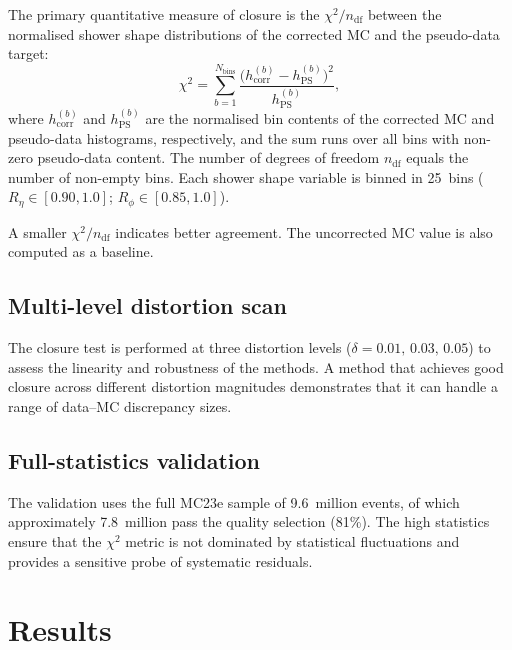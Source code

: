 \documentclass[12pt,a4paper]{article}
\begin{document}
The primary quantitative measure of closure is the $\chi^2/n_\text{df}$
between the normalised shower shape distributions of the corrected MC and the
pseudo-data target:
\begin{equation}
  \chi^2 = \sum_{b=1}^{N_\text{bins}}
    \frac{\bigl(h_\text{corr}^{(b)} - h_\text{PS}^{(b)}\bigr)^2}
         {h_\text{PS}^{(b)}},
  \label{eq:chi2}
\end{equation}
where $h_\text{corr}^{(b)}$ and $h_\text{PS}^{(b)}$ are the normalised bin
contents of the corrected MC and pseudo-data histograms, respectively, and the
sum runs over all bins with non-zero pseudo-data content. The number of
degrees of freedom $n_\text{df}$ equals the number of non-empty bins. Each
shower shape variable is binned in 25~bins
($R_\eta\in[0.90,1.0]$;
$R_\phi\in[0.85,1.0]$).

A smaller $\chi^2/n_\text{df}$ indicates better agreement. The uncorrected MC
value is also computed as a baseline.

\subsection{Multi-level distortion scan}
\label{sec:validation:scan}

The closure test is performed at three distortion levels
($\delta=0.01,\,0.03,\,0.05$) to assess the linearity and robustness of the
methods. A method that achieves good closure across different distortion
magnitudes demonstrates that it can handle a range of data--MC discrepancy
sizes.

\subsection{Full-statistics validation}
\label{sec:validation:stats}

The validation uses the full MC23e sample of 9.6~million events, of which
approximately 7.8~million pass the quality selection (81\%). The high
statistics ensure that the $\chi^2$ metric is not dominated by statistical
fluctuations and provides a sensitive probe of systematic residuals.

\section{Results}
\label{sec:results}
\end{document}
